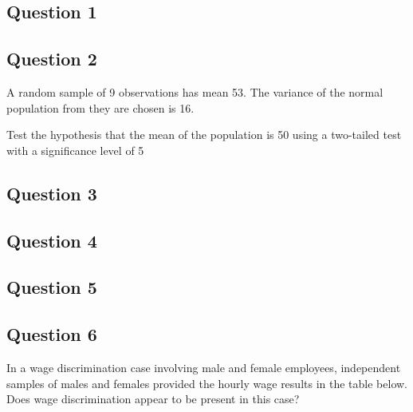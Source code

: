 \subsection{Question 1}

\subsection{Question 2}
A random sample of 9 observations has mean 53. The variance of the normal population from they are chosen is 16.

Test the hypothesis that the mean of the population is 50 using a two-tailed test with a significance level of 5%
\subsection{Question 3}

\subsection{Question 4}

\subsection{Question 5}

\subsection{Question 6}

In a wage discrimination case involving male and female employees, independent samples of males and females provided the hourly
wage results in the table below.
Does wage discrimination appear to be present in this case?

